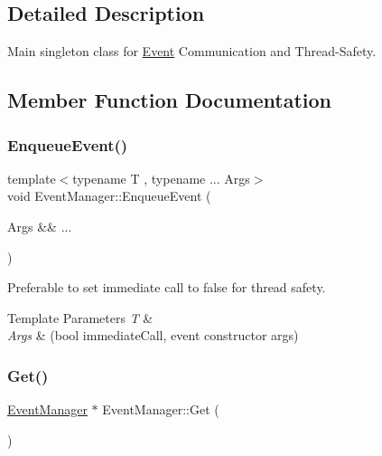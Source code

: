 \subsection{Detailed Description}
Main singleton class for \hyperlink{classEvent}{Event} Communication and Thread-\/\+Safety. 

\subsection{Member Function Documentation}
\mbox{\label{classEventManager_a3b85396571e407ca10908979a9ca958b}} 
\subsubsection{\texorpdfstring{Enqueue\+Event()}{EnqueueEvent()}}
{\footnotesize\ttfamily template$<$typename T , typename ... Args$>$ \\
void Event\+Manager\+::\+Enqueue\+Event (\begin{DoxyParamCaption}\item[{Args \&\&}]{... }\end{DoxyParamCaption})}



Preferable to set immediate call to false for thread safety. 


\begin{DoxyTemplParams}{Template Parameters}
{\em T} & \\
\hline
{\em Args} & (bool immediate\+Call, event constructor args) \\
\hline
\end{DoxyTemplParams}
\mbox{\label{classEventManager_ac8154ede54d2ca9c81c2530f903b20fe}} 
\subsubsection{\texorpdfstring{Get()}{Get()}}
{\footnotesize\ttfamily \hyperlink{classEventManager}{Event\+Manager} $\ast$ Event\+Manager\+::\+Get (\begin{DoxyParamCaption}{ }\end{DoxyParamCaption})\hspace{0.3cm}{\ttfamily [static]}}



